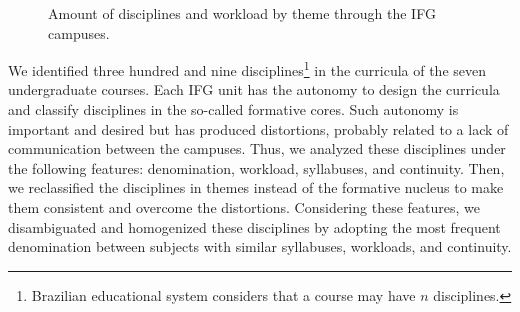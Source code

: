 \documentclass[sigconf, review]{educomp}
\begin{document}
\begin{figure}[!htbp]
    \centering
    \qquad
    \caption{Amount of disciplines and workload by theme through the IFG campuses.}%
    \label{fig_themes}%
\end{figure}

We identified three hundred and nine disciplines\footnote{Brazilian educational system considers that a course may have $n$ disciplines.} in the curricula of the seven undergraduate courses.
Each IFG unit has the autonomy to design the curricula and classify disciplines in the so-called formative cores.
Such autonomy is important and desired but has produced distortions, probably related to a lack of communication between the campuses.
Thus, we analyzed these disciplines under the following features: denomination, workload, syllabuses, and continuity.
Then, we reclassified the disciplines in themes instead of the formative nucleus to make them consistent and overcome the distortions.
Considering these features, we disambiguated and homogenized these disciplines by adopting the most frequent denomination between subjects with similar syllabuses, workloads, and continuity.
\end{document}
